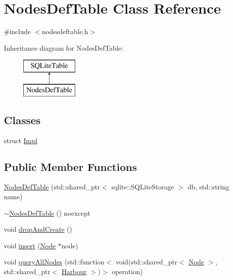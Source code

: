 \hypertarget{class_nodes_def_table}{}\section{Nodes\+Def\+Table Class Reference}
\label{class_nodes_def_table}


{\ttfamily \#include $<$nodesdeftable.\+h$>$}

Inheritance diagram for Nodes\+Def\+Table\+:\begin{figure}[H]
\begin{center}
\leavevmode
\includegraphics[height=2.000000cm]{dc/d18/class_nodes_def_table}
\end{center}
\end{figure}
\subsection*{Classes}
\begin{DoxyCompactItemize}
\item 
struct \mbox{\hyperlink{struct_nodes_def_table_1_1_impl}{Impl}}
\end{DoxyCompactItemize}
\subsection*{Public Member Functions}
\begin{DoxyCompactItemize}
\item 
\mbox{\hyperlink{class_nodes_def_table_a039282d7516ffa4a5f9f2843c8eca2bf}{Nodes\+Def\+Table}} (std\+::shared\+\_\+ptr$<$ sqlite\+::\+S\+Q\+Lite\+Storage $>$ db, std\+::string name)
\item 
\mbox{\hyperlink{class_nodes_def_table_a7245156e06fc5a05da08ad6e73011ad1}{$\sim$\+Nodes\+Def\+Table}} () noexcept
\item 
void \mbox{\hyperlink{class_nodes_def_table_a48e50902bff4f9c52ff01e0048d2ae6b}{drop\+And\+Create}} ()
\item 
void \mbox{\hyperlink{class_nodes_def_table_a1089d94496f6d3bbeaee38de2fc34ff6}{insert}} (\mbox{\hyperlink{class_node}{Node}} $\ast$node)
\item 
void \mbox{\hyperlink{class_nodes_def_table_a41ee8c32c215441940c754622b7df030}{query\+All\+Nodes}} (std\+::function$<$ void(std\+::shared\+\_\+ptr$<$ \mbox{\hyperlink{class_node}{Node}} $>$, std\+::shared\+\_\+ptr$<$ \mbox{\hyperlink{class_harbour}{Harbour}} $>$)$>$ operation)
\end{DoxyCompactItemize}


